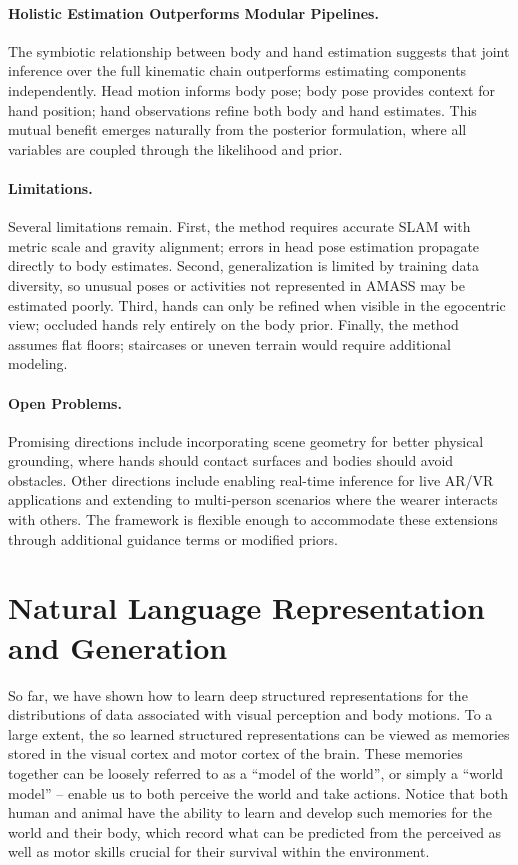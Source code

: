 \documentclass[../../book-main.tex]{subfiles}
\begin{document}
\paragraph{Holistic Estimation Outperforms Modular Pipelines.}
The symbiotic relationship between body and hand estimation suggests
that joint inference over the full kinematic chain outperforms
estimating components independently. Head motion informs body pose;
body pose provides context for hand position; hand observations
refine both body and hand estimates. This mutual benefit emerges
naturally from the posterior formulation, where all variables are
coupled through the likelihood and prior.

\paragraph{Limitations.}
Several limitations remain. First, the method requires accurate SLAM
with metric scale and gravity alignment; errors in head pose
estimation propagate directly to body estimates. Second,
generalization is limited by training data diversity, so unusual
poses or activities not represented in AMASS may be estimated poorly.
Third, hands can only be refined when visible in the egocentric view;
occluded hands rely entirely on the body prior. Finally, the method
assumes flat floors; staircases or uneven terrain would require
additional modeling.

\paragraph{Open Problems.}
Promising directions include incorporating scene geometry for better
physical grounding, where hands should contact surfaces and bodies
should avoid obstacles. Other directions include enabling real-time
inference for live AR/VR applications and extending to multi-person
scenarios where the wearer interacts with others. The framework is
flexible enough to accommodate these extensions through additional
guidance terms or modified priors.

\section{Natural Language Representation and Generation}\label{sec:clm_text}
So far, we have shown how to learn deep structured representations
for the distributions of data associated with visual perception and
body motions. To a large extent, the so learned structured
representations can be viewed as memories stored in the visual cortex
and motor cortex of the brain. These memories together can be loosely
referred to as a ``model of the world'', or simply a ``world model''
-- enable us to both perceive the world and take actions. Notice that
both human and animal have the ability to learn and develop such
memories for the world and their body, which record what can be
predicted from the perceived as well as motor skills crucial for
their survival within the environment.
\end{document}
